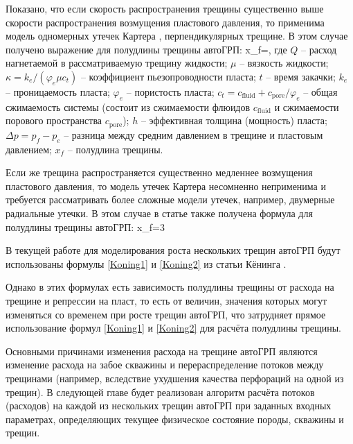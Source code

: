 Показано, что если скорость распространения трещины существенно выше скорости распространения возмущения пластового давления, то применима модель одномерных утечек Картера \cite{karter}, перпендикулярных трещине.
В этом случае получено выражение для полудлины трещины автоГРП:
\beq\label{Koning1}
x_{\!f}=,
\eeq
где $Q$ -- расход нагнетаемой в рассматриваемую трещину жидкости;
$\mu$ -- вязкость жидкости;
$\kappa=k_e/(\varphi_e\mu c_t)$ -- коэффициент пьезопроводности пласта;
$t$ -- время закачки;
$k_e$ -- проницаемость пласта;
$\varphi_e$ -- пористость пласта;\newline
$c_t=c_{\text{fluid}}+c_{\text{pore}}/\varphi_e$ -- общая сжимаемость системы (состоит из сжимаемости флюидов $c_{\text{fluid}}$ и сжимаемости порового пространства $c_{\text{pore}}$);
$h$ -- эффективная толщина (мощность) пласта;
$\Delta p=p_{\!f}-p_e$ -- разница между средним давлением в трещине и пластовым давлением; $x_f$ -- полудлина трещины.

Если же трещина распространяется существенно медленнее возмущения пластового давления, то модель утечек Картера несомненно неприменима и требуется рассматривать более сложные модели утечек, например, двумерные радиальные утечки.
В этом случае в статье \cite{koning} также получена формула для полудлины трещины автоГРП:
\beq\label{Koning2}
x_{\!f}=3
\eeq

В текущей работе для моделирования роста нескольких трещин автоГРП будут использованы формулы \eqref{Koning1} и \eqref{Koning2} из статьи Кёнинга \cite{koning}.

Однако в этих формулах есть зависимость полудлины трещины от расхода на трещине и репрессии на пласт, то есть от величин, значения которых могут изменяться со временем при росте трещин автоГРП, что затрудняет прямое использование формул \eqref{Koning1} и \eqref{Koning2} для расчёта полудлины трещины.

Основными причинами изменения расхода на трещине автоГРП являются изменение расхода на забое скважины и перераспределение потоков между трещинами (например, вследствие ухудшения качества перфораций на одной из трещин).
В следующей главе будет реализован алгоритм расчёта потоков (расходов) на каждой из нескольких трещин автоГРП при заданных входных параметрах, определяющих текущее физическое состояние породы, скважины и трещин.




